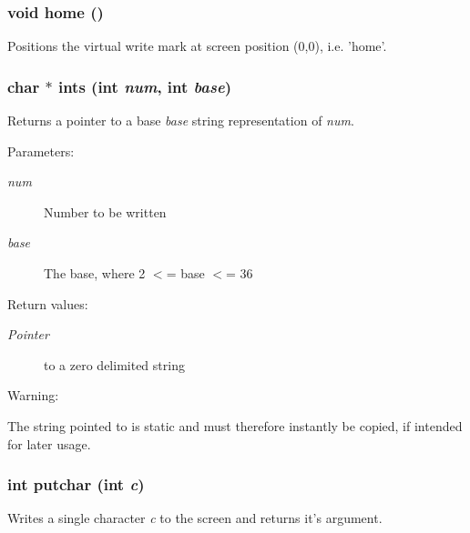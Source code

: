 \subsubsection{\setlength{\rightskip}{0pt plus 5cm}void home ()}\label{hpconio_8h_a10}


Positions the virtual write mark at screen position (0,0), i.e. 'home'.

\subsubsection{\setlength{\rightskip}{0pt plus 5cm}char $\ast$ ints (int {\em num}, int {\em base})}\label{hpconio_8h_a2}


Returns a pointer to a base {\em base} string representation of {\em num}.

\begin{Desc}
\item[Parameters: ]\par
\begin{description}
\item[{\em 
num}]Number to be written \item[{\em 
base}]The base, where 2 $<$= base $<$= 36 \end{description}
\end{Desc}
\begin{Desc}
\item[Return values: ]\par
\begin{description}
\item[{\em 
Pointer}]to a zero delimited string\end{description}
\end{Desc}
\begin{Desc}
\item[Warning: ]\par
The string pointed to is static and must therefore instantly be copied, if intended for later usage. \end{Desc}
\subsubsection{\setlength{\rightskip}{0pt plus 5cm}int putchar (int {\em c})}\label{hpconio_8h_a4}


Writes a single character {\em c} to the screen and returns it's argument.

